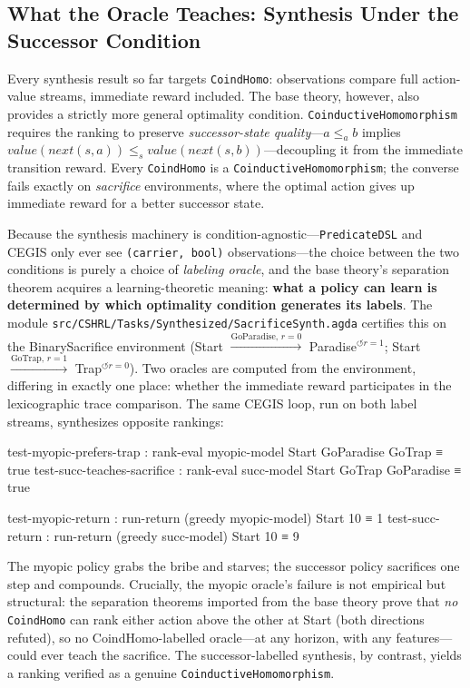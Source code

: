 \documentclass[9pt,a4paper]{article}
\newcommand{\fpath}[1]{\nolinkurl{#1}}
\theoremstyle{plain}
\theoremstyle{definition}
\theoremstyle{remark}
\begin{document}
\subsection{What the Oracle Teaches: Synthesis Under the Successor Condition}
\label{sec:successor-synth}

Every synthesis result so far targets \texttt{CoindHomo}: observations compare full action-value streams, immediate reward included.  The base theory, however, also provides a strictly more general optimality condition.  \texttt{CoinductiveHomomorphism}~\cite{CSHRLSuccessor} requires the ranking to preserve \emph{successor-state quality}---$a \le_a b$ implies $\mathit{value}(\mathit{next}(s,a)) \le_s \mathit{value}(\mathit{next}(s,b))$---decoupling it from the immediate transition reward.  Every \texttt{CoindHomo} is a \texttt{CoinductiveHomomorphism}; the converse fails exactly on \emph{sacrifice} environments, where the optimal action gives up immediate reward for a better successor state.

Because the synthesis machinery is condition-agnostic---\texttt{PredicateDSL} and CEGIS only ever see \texttt{(carrier, bool)} observations---the choice between the two conditions is purely a choice of \emph{labeling oracle}, and the base theory's separation theorem acquires a learning-theoretic meaning: \textbf{what a policy can learn is determined by which optimality condition generates its labels}.  The module \fpath{src/CSHRL/Tasks/Synthesized/SacrificeSynth.agda} certifies this on the BinarySacrifice environment (Start $\xrightarrow{\text{GoParadise},\,r=0}$ Paradise$^{\circlearrowleft r=1}$; Start $\xrightarrow{\text{GoTrap},\,r=1}$ Trap$^{\circlearrowleft r=0}$).  Two oracles are computed from the environment, differing in exactly one place: whether the immediate reward participates in the lexicographic trace comparison.  The same CEGIS loop, run on both label streams, synthesizes opposite rankings:
\begin{spec}
test-myopic-prefers-trap    : rank-eval myopic-model Start GoParadise GoTrap ≡ true
test-succ-teaches-sacrifice : rank-eval succ-model   Start GoTrap GoParadise ≡ true

test-myopic-return : run-return (greedy myopic-model) Start 10 ≡ 1
test-succ-return   : run-return (greedy succ-model)   Start 10 ≡ 9
\end{spec}
The myopic policy grabs the bribe and starves; the successor policy sacrifices one step and compounds.  Crucially, the myopic oracle's failure is not empirical but structural: the separation theorems imported from the base theory prove that \emph{no} \texttt{CoindHomo} can rank either action above the other at Start (both directions refuted), so no CoindHomo-labelled oracle---at any horizon, with any features---could ever teach the sacrifice.  The successor-labelled synthesis, by contrast, yields a ranking verified as a genuine \texttt{CoinductiveHomomorphism}.
\end{document}

